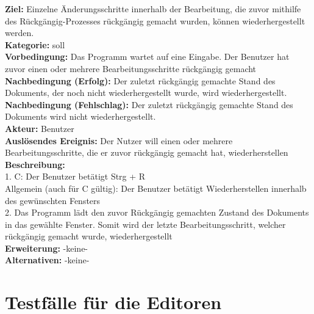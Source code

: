 \documentclass[a4paper]{scrreprt}
\begin{document}
\textbf{Ziel:} Einzelne Änderungsschritte innerhalb der Bearbeitung, die zuvor mithilfe des Rückgängig-Prozesses rückgängig gemacht wurden, können wiederhergestellt werden.\\
\textbf{Kategorie:} soll\\
\textbf{Vorbedingung:} Das Programm wartet auf eine Eingabe. Der Benutzer hat zuvor einen oder mehrere Bearbeitungsschritte rückgängig gemacht\\
\textbf{Nachbedingung (Erfolg):} Der zuletzt rückgängig gemachte Stand des Dokuments, der noch nicht wiederhergestellt wurde, wird wiederhergestellt.
\textbf{Nachbedingung (Fehlschlag):} Der zuletzt rückgängig gemachte Stand des Dokuments wird nicht wiederhergestellt.\\
\textbf{Akteur:} Benutzer\\
\textbf{Auslösendes Ereignis:} Der Nutzer will einen oder mehrere Bearbeitungsschritte, die er zuvor rückgängig gemacht hat, wiederherstellen\\
\textbf{Beschreibung:} \\
1. C: Der Benutzer betätigt Strg +  R\\
Allgemein (auch für C gültig): Der Benutzer betätigt Wiederherstellen innerhalb des gewünschten Fensters\\
2. Das Programm lädt den zuvor Rückgängig gemachten Zustand des Dokuments in das gewählte Fenster. Somit wird der letzte Bearbeitungsschritt, welcher rückgängig gemacht wurde, wiederhergestellt \\
\textbf {Erweiterung:} -keine- \\
\textbf {Alternativen:} -keine- \\

\section{Testfälle für die Editoren}
\end{document}
